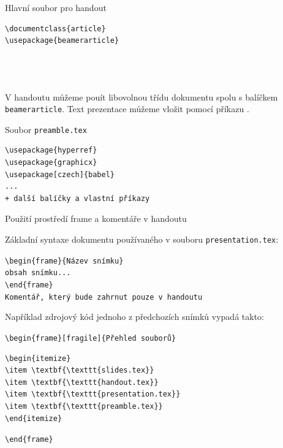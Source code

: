 \begin{frame}[fragile]{Hlavní soubor pro handout}
\begin{verbatim}
\documentclass{article}
\usepackage{beamerarticle}




\end{verbatim}

\end{frame}


V handoutu můžeme pouít libovolnou třídu dokumentu spolu s balíčkem \texttt{beamerarticle}.
Text prezentace můžeme vložit pomocí příkazu \verb||. 

\begin{frame}[fragile]{Soubor \texttt{preamble.tex}}
\begin{verbatim}
\usepackage{hyperref}
\usepackage{graphicx}
\usepackage[czech]{babel}
...
+ další balíčky a vlastní příkazy
\end{verbatim}
\end{frame}


\begin{frame}[fragile]{Použití prostředí frame a komentáře v handoutu}

  \begin{block}{Základní syntaxe dokumentu používaného v souboru \texttt{presentation.tex}:}
\begin{likeverbatim}\verb|\begin{frame}{Název snímku}|\\
\verb|obsah snímku...|\\
\verb|\end|\verb|{frame}|\\
\vspace{1em}
\verb|Komentář, který bude zahrnut pouze v handoutu|
\end{likeverbatim}
\end{block}

\end{frame}

Například zdrojový kód jednoho z předchozích snímků vypadá takto:

\verb|\begin|\verb|{frame}[fragile]{Přehled souborů}|
\begin{verbatim}
\begin{itemize}
\item \textbf{\texttt{slides.tex}}
\item \textbf{\texttt{handout.tex}}
\item \textbf{\texttt{presentation.tex}}
\item \textbf{\texttt{preamble.tex}}
\end{itemize}
\end{verbatim}
\verb|\end|\verb|{frame}|

